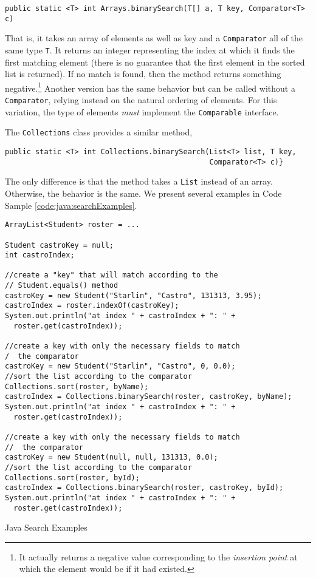 \texttt{public static <T> int Arrays.binarySearch(T[] a, T key, Comparator<T> c)}

That is, it takes an array of elements as well as key and a 
\texttt{Comparator} all of the same type \texttt{T}.
It returns an integer representing the index at which it finds the first
matching element (there is no guarantee that the first element in the
sorted list is returned).  If no match is found, then the method returns
something negative.\footnote{It actually returns a negative value corresponding
to the \emph{insertion point} at which the element would be if it had
existed.}  Another version has the same behavior but can be called without
a \texttt{Comparator}, relying instead on the natural ordering of
elements.  For this variation, the type of elements \emph{must} implement
the \texttt{Comparable} interface.

The \texttt{Collections} class provides a similar method, 

\begin{verbatim}
public static <T> int Collections.binarySearch(List<T> list, T key, 
                                               Comparator<T> c)}
\end{verbatim}

The only difference is that the method takes a \texttt{List} instead
of an array.  Otherwise, the behavior is the same.  We present several examples
in Code Sample \ref{code:java:searchExamples}.

\begin{listing}[H]
\begin{verbatim}
ArrayList<Student> roster = ...
		
Student castroKey = null;
int castroIndex;
		
//create a "key" that will match according to the 
// Student.equals() method
castroKey = new Student("Starlin", "Castro", 131313, 3.95);
castroIndex = roster.indexOf(castroKey);
System.out.println("at index " + castroIndex + ": " + 
  roster.get(castroIndex));

//create a key with only the necessary fields to match 
/  the comparator
castroKey = new Student("Starlin", "Castro", 0, 0.0);
//sort the list according to the comparator
Collections.sort(roster, byName);
castroIndex = Collections.binarySearch(roster, castroKey, byName);
System.out.println("at index " + castroIndex + ": " + 
  roster.get(castroIndex));

//create a key with only the necessary fields to match 
//  the comparator
castroKey = new Student(null, null, 131313, 0.0);
//sort the list according to the comparator
Collections.sort(roster, byId);
castroIndex = Collections.binarySearch(roster, castroKey, byId);
System.out.println("at index " + castroIndex + ": " + 
  roster.get(castroIndex));
\end{verbatim}
\caption{Java Search Examples}
\label{code:java:searchExamples}
\end{listing}

